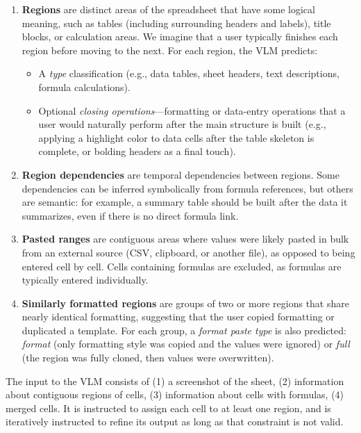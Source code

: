 \documentclass{article}
\theoremstyle{plain}
\theoremstyle{definition}
\theoremstyle{remark}
\begin{document}
\begin{enumerate}
    \item \textbf{Regions} are distinct areas of the spreadsheet that have some logical meaning, such as tables (including surrounding headers and labels), title blocks, or calculation areas.
    We imagine that a user typically finishes each region before moving to the next. For each region, the VLM predicts:
    \begin{itemize}
        \item A \emph{type} classification (e.g., data tables, sheet headers, text descriptions, formula calculations).
        \item Optional \emph{closing operations}---formatting or data-entry operations that a user would naturally perform after the main structure is built (e.g., applying a highlight color to data cells after the table skeleton is complete, or bolding headers as a final touch).
    \end{itemize}
    
    \item \textbf{Region dependencies} are temporal dependencies between regions.
    Some dependencies can be inferred symbolically from formula references, but others are semantic: for example, a summary table should be built after the data it summarizes, even if there is no direct formula link.
    
    \item \textbf{Pasted ranges} are contiguous areas where values were likely pasted in bulk from an external source (CSV, clipboard, or another file), as opposed to being entered cell by cell.
    Cells containing formulas are excluded, as formulas are typically entered individually.
    
    \item \textbf{Similarly formatted regions} are groups of two or more regions that share nearly identical formatting, suggesting that the user copied formatting or duplicated a template.
    For each group, a \emph{format paste type} is also predicted: \emph{format} (only formatting style was copied and the values were ignored) or \emph{full} (the region was fully cloned, then values were overwritten).
\end{enumerate}

The input to the VLM consists of (1) a screenshot of the sheet, (2) information about contiguous regions of cells, (3) information about cells with formulas, (4) merged cells.
It is instructed to assign each cell to at least one region, and is iteratively instructed to refine its output as long as that constraint is not valid.
\end{document}
